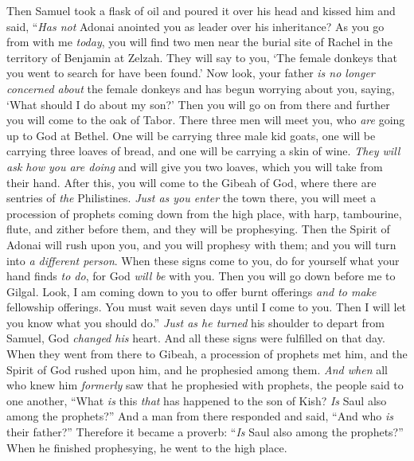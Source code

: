 \begin{biblechapter} %
 Then Samuel took a flask of oil and poured it over his head and kissed him and said, “\textit{Has not} Adonai anointed you as leader over his inheritance?
\verse As you go from with me \textit{today}, you will find two men near the burial site of Rachel in the territory of Benjamin at Zelzah. They will say to you, ‘The female donkeys that you went to search for have been found.’ Now look, your father \textit{is no longer concerned about} the female donkeys and has begun worrying about you, saying, ‘What should I do about my son?’
\verse Then you will go on from there and further you will come to the oak of Tabor. There three men will meet you, who \textit{are} going up to God at Bethel. One will be carrying three male kid goats, one will be carrying three loaves of bread, and one will be carrying a skin of wine.
\verse \textit{They will ask how you are doing} and will give you two loaves, which you will take from their hand.
\verse After this, you will come to the Gibeah of God, where there are sentries of \textit{the} Philistines. \textit{Just as you enter} the town there, you will meet a procession of prophets coming down from the high place, with harp, tambourine, flute, and zither before them, and they will be prophesying.
\verse Then the Spirit of Adonai will rush upon you, and you will prophesy with them; and you will turn into \textit{a different person}.
\verse When these signs come to you, do for yourself what your hand finds \textit{to do}, for God \textit{will be} with you.
\verse Then you will go down before me to Gilgal. Look, I am coming down to you to offer burnt offerings \textit{and to make} fellowship offerings. You must wait seven days until I come to you. Then I will let you know what you should do.”
\verse \textit{Just as he turned} his shoulder to depart from Samuel, God \textit{changed his} heart. And all these signs were fulfilled on that day.
\verse When they went from there to Gibeah, a procession of prophets met him, and the Spirit of God rushed upon him, and he prophesied among them.
\verse \textit{And when} all who knew him \textit{formerly} saw that he prophesied with prophets, the people said to one another, “What \textit{is} this \textit{that} has happened to the son of Kish? \textit{Is} Saul also among the prophets?”
\verse And a man from there responded and said, “And who \textit{is} their father?” Therefore it became a proverb: “\textit{Is} Saul also among the prophets?”
\verse When he finished prophesying, he went to the high place.

\end{biblechapter}
